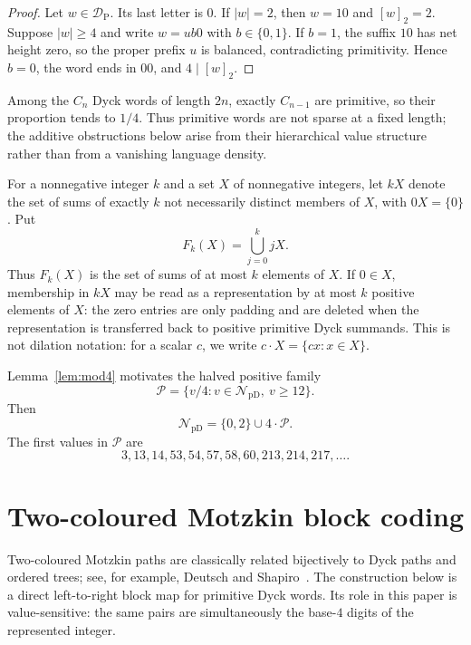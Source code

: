 \documentclass[11pt]{article}
\theoremstyle{plain}
\theoremstyle{definition}
\newcommand{\NpD}{\mathcal{N}_{\mathrm{pD}}}
\newcommand{\DP}{\mathcal{D}_{\mathrm{P}}}
\newcommand{\Pset}{\mathcal P}
\begin{document}
\begin{proof}
Let $w\in\DP$.  Its last letter is $0$.  If $|w|=2$, then $w=10$ and
$[w]_2=2$.  Suppose $|w|\geq4$ and write $w=ub0$ with $b\in\{0,1\}$.
If $b=1$, the suffix $10$ has net height zero, so the proper prefix $u$
is balanced, contradicting primitivity.  Hence $b=0$, the word ends in
$00$, and $4\mid[w]_2$.
\end{proof}

Among the $C_n$ Dyck words of length $2n$, exactly $C_{n-1}$ are
primitive, so their proportion tends to $1/4$.  Thus primitive words are
not sparse at a fixed length; the additive obstructions below arise from
their hierarchical value structure rather than from a vanishing language
density.

For a nonnegative integer $k$ and a set $X$ of nonnegative integers, let
$kX$ denote the set of sums of exactly $k$ not necessarily distinct
members of $X$, with $0X=\{0\}$.  Put
\[
 F_k(X)=\bigcup_{j=0}^{k}jX.
\]
Thus $F_k(X)$ is the set of sums of at most $k$ elements of $X$.  If
$0\in X$, membership in $kX$ may be read as a representation by at most
$k$ positive elements of $X$: the zero entries are only padding and are
deleted when the representation is transferred back to positive primitive
Dyck summands.  This is not dilation notation: for a scalar $c$, we write
$c\cdot X=\{cx:x\in X\}$.

Lemma~\ref{lem:mod4} motivates the halved positive family
\begin{equation}\label{eq:P-def}
 \Pset=\{v/4:v\in\NpD,\ v\geq12\}.
\end{equation}
Then
\begin{equation}\label{eq:NpD-decomp}
 \NpD=\{0,2\}\cup4\cdot\Pset.
\end{equation}
The first values in $\Pset$ are
\[
 3,13,14,53,54,57,58,60,213,214,217,\ldots.
\]

\section{Two-coloured Motzkin block coding}\label{sec:base4}

Two-coloured Motzkin paths are classically related bijectively to Dyck
paths and ordered trees; see, for example, Deutsch and
Shapiro~\cite{DeutschShapiro}.  The construction below is a direct
left-to-right block map for primitive Dyck words.  Its role in this paper
is value-sensitive: the same pairs are simultaneously the base-$4$ digits
of the represented integer.
\end{document}
